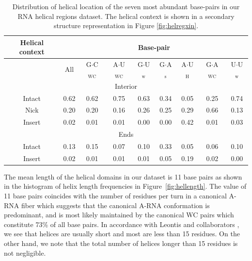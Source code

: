 \begin{table}[htbp]
\begin{center}
\begin{tabular}{|c|c|c|c|c|c|c|c|c|}
\hline
Helical context & \multicolumn{8}{c|}{Base-pair} \\
\hline
 & All & G$\cdot$C$_{\text{WC}}$ & A$\cdot$U$_{\text{WC}}$ &
G$\cdot$U$_{\text{w}}$ & G$\cdot$A$_{\text{s}}$ &
A$\cdot$U$_{\text{H}}$ & G$\cdot$A$_{\text{WC}}$ &
U$\cdot$U$_{\text{w}}$  \\
\hline
\multicolumn{9}{|c|}{Interior} \\
\hline
Intact &  0.62 & 0.62 & 0.75 & 0.63 & 0.34 & 0.05 & 0.25 & 0.74 \\
Nick   &  0.20 & 0.20 & 0.16 & 0.26 & 0.25 & 0.29 & 0.66 & 0.13 \\
Insert &  0.02 & 0.01 & 0.01 & 0.00 & 0.00 & 0.42 & 0.01 & 0.03 \\
\hline
\multicolumn{9}{|c|}{Ends} \\
\hline
Intact &  0.13 & 0.15 & 0.07 & 0.10 & 0.33 & 0.05 & 0.06 & 0.10 \\
Insert &  0.02 & 0.01 & 0.01 & 0.01 & 0.05 & 0.19 & 0.02 & 0.00 \\
\hline
\end{tabular}
\caption{Distribution of helical location of the seven most abundant
  base-pairs in  our RNA helical regions dataset.  The helical context
  is  shown in  a secondary  structure representation  in Figure
  \ref{fig:helregxin}.}
\label{tab:helcontext}
\end{center}
\end{table}

The mean length of the helical domains in our dataset is 11 base pairs
as   shown  in   the  histogram   of  helix   length   frequencies  in
Figure~\ref{fig:hellength}.  The value of 11 base pairs coincides with
the  number  of   residues  per  turn  in  a   canonical  A-RNA  fiber
\cite{arnott1968} which suggests that the canonical A-RNA conformation
is  predominant, and  is most  likely maintained  by the  canonical WC
pairs which  constitute 73\%  of all base  pairs.  In  accordance with
Leontis and collaborators \cite{nasalean2009}, we see that helices are
usually short and  most are less than 15 residues.  On the other hand,
we note  that the total number  of helices longer than  15 residues is
not negligible.

